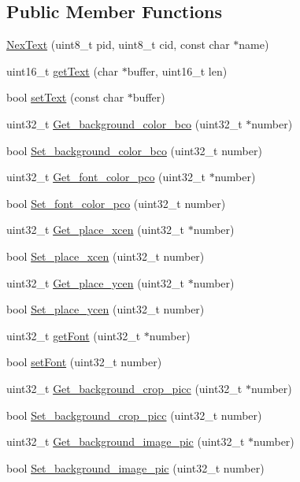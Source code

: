 \subsection*{Public Member Functions}
\begin{DoxyCompactItemize}
\item 
\hyperlink{class_nex_text_a38b4dd752d39bfda4ef7642b43ded91a}{Nex\+Text} (uint8\+\_\+t pid, uint8\+\_\+t cid, const char $\ast$name)
\item 
uint16\+\_\+t \hyperlink{class_nex_text_a9cf417b2f25df2872492c55bdc9f5b30}{get\+Text} (char $\ast$buffer, uint16\+\_\+t len)
\item 
bool \hyperlink{class_nex_text_a19589b32c981436a1bbcfe407bc766e3}{set\+Text} (const char $\ast$buffer)
\item 
uint32\+\_\+t \hyperlink{class_nex_text_aec8d21665688ba80f3136a1f5e23fef5}{Get\+\_\+background\+\_\+color\+\_\+bco} (uint32\+\_\+t $\ast$number)
\item 
bool \hyperlink{class_nex_text_a1b1586e5e66d76a4f8f5c40b0986f471}{Set\+\_\+background\+\_\+color\+\_\+bco} (uint32\+\_\+t number)
\item 
uint32\+\_\+t \hyperlink{class_nex_text_a860af363c6de6180ef356cad31936185}{Get\+\_\+font\+\_\+color\+\_\+pco} (uint32\+\_\+t $\ast$number)
\item 
bool \hyperlink{class_nex_text_ab59df7e777198eefb422ba2081d0cfce}{Set\+\_\+font\+\_\+color\+\_\+pco} (uint32\+\_\+t number)
\item 
uint32\+\_\+t \hyperlink{class_nex_text_a510a937a104b41859badc220a8ba39fb}{Get\+\_\+place\+\_\+xcen} (uint32\+\_\+t $\ast$number)
\item 
bool \hyperlink{class_nex_text_ab94a4b8505a9bfdf8fb4cb8cb32a1763}{Set\+\_\+place\+\_\+xcen} (uint32\+\_\+t number)
\item 
uint32\+\_\+t \hyperlink{class_nex_text_a9bd42732e37497a8fb44ece94b39285c}{Get\+\_\+place\+\_\+ycen} (uint32\+\_\+t $\ast$number)
\item 
bool \hyperlink{class_nex_text_a0f8ad9780c8145569da6736d0ee494e4}{Set\+\_\+place\+\_\+ycen} (uint32\+\_\+t number)
\item 
uint32\+\_\+t \hyperlink{class_nex_text_adc480199a2b396811aa0c14928b592c8}{get\+Font} (uint32\+\_\+t $\ast$number)
\item 
bool \hyperlink{class_nex_text_a5dd7fdda945a76033ef8fe8dc68e3e52}{set\+Font} (uint32\+\_\+t number)
\item 
uint32\+\_\+t \hyperlink{class_nex_text_ae44393fb20ba449bf088dbd0758b4219}{Get\+\_\+background\+\_\+crop\+\_\+picc} (uint32\+\_\+t $\ast$number)
\item 
bool \hyperlink{class_nex_text_a3727463a4fc0e1df978cd8fc7d1103ed}{Set\+\_\+background\+\_\+crop\+\_\+picc} (uint32\+\_\+t number)
\item 
uint32\+\_\+t \hyperlink{class_nex_text_aed07b3988fe2c4ec332727bb245e49a5}{Get\+\_\+background\+\_\+image\+\_\+pic} (uint32\+\_\+t $\ast$number)
\item 
bool \hyperlink{class_nex_text_ab2c85ac7d5184e124b0cd724028c1915}{Set\+\_\+background\+\_\+image\+\_\+pic} (uint32\+\_\+t number)
\end{DoxyCompactItemize}
